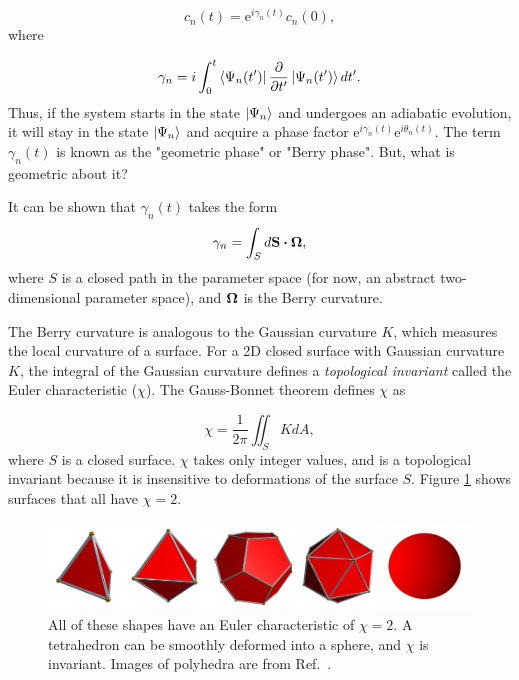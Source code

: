 \documentclass[double,12pt,1in,seploa]{beavtex}
\begin{document}
\begin{equation}
    c_n(t) = \mathrm{e}^{i \gamma_n(t)}c_n(0),
\end{equation}
where 

\begin{equation}
    \gamma_n = i \int_{0}^{t} \bra{\Psi_n(t')}\pdv{t'}\ket{\Psi_n(t')} dt'. \label{geometric phase}
\end{equation}
Thus, if the system starts in the state $\ket{\Psi_n}$ and undergoes an adiabatic evolution, it will stay in the state $\ket{\Psi_n}$ and acquire a phase factor $\mathrm{e}^{i \gamma_n(t)} \mathrm{e}^{i \theta_n(t)}$. The term $\gamma_n(t)$ is known as the "geometric phase" or "Berry phase". But, what is geometric about it? 

It can be shown that $\gamma_n(t)$ takes the form \cite[p.\ 349-351]{sakurai_modern_1985}
\begin{equation}
    \gamma_n = \int_{S} d\vectorbold{S}\dotproduct \vectorbold{\Omega},
\end{equation}
where $S$ is a closed path in the parameter space (for now, an abstract two-dimensional parameter space), and $\vectorbold{\Omega}$ is the Berry curvature. 

The Berry curvature is analogous to the Gaussian curvature $K$, which measures the local curvature of a surface. For a 2D closed surface with Gaussian curvature $K$, the integral of the Gaussian curvature defines a \textit{topological invariant} called the Euler characteristic ($\chi$). The Gauss-Bonnet theorem defines $\chi$ as

\begin{equation}
    \chi = \frac{1}{2\pi}\iint_S K dA,
\end{equation}
where $S$ is a closed surface. $\chi$ takes only integer values, and is a topological invariant because it is insensitive to deformations of the surface $S$. Figure \ref{surfaces} shows surfaces that all have $\chi = 2$.

\begin{figure}
    \includegraphics{shapes intro fig.pdf}
    \caption{All of these shapes have an Euler characteristic of $\chi = 2$. A tetrahedron can be smoothly deformed into a sphere, and $\chi$ is invariant. Images of polyhedra are from Ref.\ \cite{webb_stella_nodate}.}
    \label{surfaces}
\end{figure}
\end{document}
